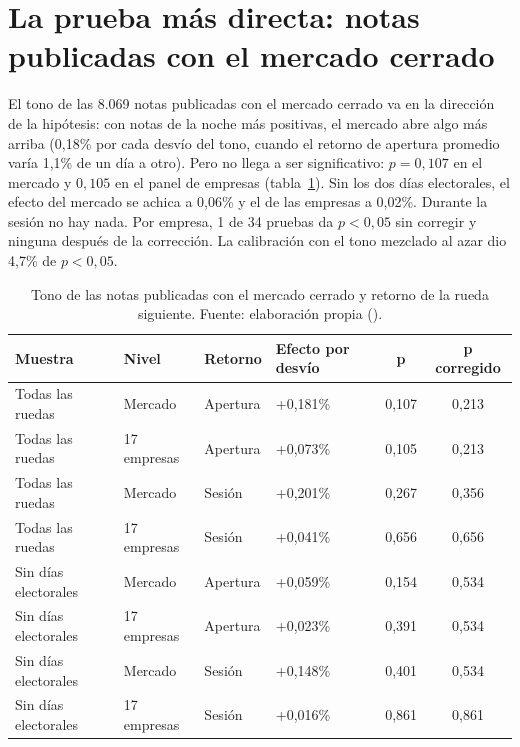 \section{La prueba más directa: notas publicadas con el mercado cerrado}
\label{sec:res-u6b}

El tono de las 8.069 notas publicadas con el mercado cerrado va en la dirección de la
hipótesis: con notas de la noche más positivas, el mercado abre algo más arriba (0,18\% por
cada desvío del tono, cuando el retorno de apertura promedio varía 1,1\% de un día a otro). Pero
no llega a ser significativo: $p=0{,}107$ en el mercado y $0{,}105$ en el panel de empresas
(tabla~\ref{tab:u6b}). Sin los dos días electorales, el efecto del mercado se achica a 0,06\% y
el de las empresas a 0,02\%. Durante la sesión no hay nada. Por empresa, 1 de 34 pruebas da
$p<0{,}05$ sin corregir y ninguna después de la corrección. La calibración con el tono mezclado
al azar dio 4,7\% de $p<0{,}05$.

\begin{table}[H]
\centering\small
\begin{tabular}{@{}llllcc@{}}
\toprule
\textbf{Muestra} & \textbf{Nivel} & \textbf{Retorno} & \textbf{Efecto por desvío} & \textbf{p} & \textbf{p corregido} \\
\midrule
Todas las ruedas & Mercado & Apertura & +0,181\% & 0,107 & 0,213 \\
Todas las ruedas & 17 empresas & Apertura & +0,073\% & 0,105 & 0,213 \\
Todas las ruedas & Mercado & Sesión & +0,201\% & 0,267 & 0,356 \\
Todas las ruedas & 17 empresas & Sesión & +0,041\% & 0,656 & 0,656 \\
Sin días electorales & Mercado & Apertura & +0,059\% & 0,154 & 0,534 \\
Sin días electorales & 17 empresas & Apertura & +0,023\% & 0,391 & 0,534 \\
Sin días electorales & Mercado & Sesión & +0,148\% & 0,401 & 0,534 \\
Sin días electorales & 17 empresas & Sesión & +0,016\% & 0,861 & 0,861 \\
\bottomrule
\end{tabular}
\caption{Tono de las notas publicadas con el mercado cerrado y retorno de la rueda siguiente.
Fuente: elaboración propia ().}
\label{tab:u6b}
\end{table}

